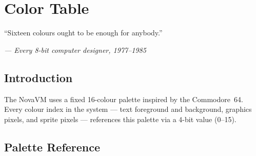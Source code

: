 \chapter{Color Table}

\epigraph{``Sixteen colours ought to be enough for anybody.''}%
{\textit{--- Every 8-bit computer designer, 1977--1985}}

\section*{Introduction}

The NovaVM uses a fixed 16-colour palette inspired by the Commodore~64.  Every
colour index in the system --- text foreground and background, graphics pixels,
and sprite pixels --- references this palette via a 4-bit value (0--15).



\section{Palette Reference}
\label{sec:color-palette}

